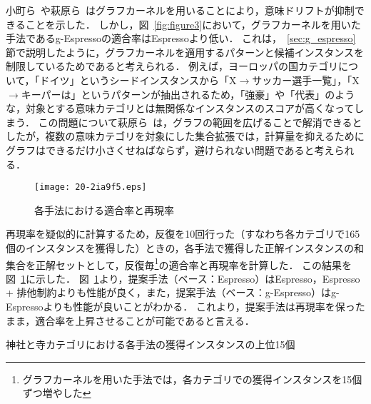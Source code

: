 \documentclass[japanese]{jnlp_1.4}
\begin{document}
小町ら~\cite{mamoru_komachi:2010}や萩原ら~\cite{masato_hagiwara:2011}はグラフカーネルを用いることにより，意味ドリフトが抑制できることを示した．
しかし，図~\ref{fig:figure3}において，グラフカーネルを用いた手法であるg-Espressoの適合率はEspressoより低い．
これは，~\ref{sec:g_espresso}節で説明したように，グラフカーネルを適用するパターンと候補インスタンスを制限しているためであると考えられる．
例えば，ヨーロッパの国カテゴリについて，「ドイツ」というシードインスタンスから「X$\to$サッカー選手一覧」，「X$\to$キーパーは」というパターンが抽出されるため，「強豪」や「代表」のような，対象とする意味カテゴリとは無関係なインスタンスのスコアが高くなってしまう．
この問題について萩原ら~\cite{masato_hagiwara:2011}は，グラフの範囲を広げることで解消できるとしたが，複数の意味カテゴリを対象にした集合拡張では，計算量を抑えるためにグラフはできるだけ小さくせねばならず，避けられない問題であると考えられる．

\begin{figure}[b]
\begin{center}
\texttt{[image: 20-2ia9f5.eps]}
\end{center}
 \caption{各手法における適合率と再現率}
 \label{fig:graph_pr_curve}
\end{figure}

再現率を疑似的に計算するため，反復を10回行った（すなわち各カテゴリで165個のインスタンスを獲得した）ときの，各手法で獲得した正解インスタンスの和集合を正解セットとして，反復毎\footnote{グラフカーネルを用いた手法では，各カテゴリでの獲得インスタンスを15個ずつ増やした}の適合率と再現率を計算した．
この結果を図~\ref{fig:graph_pr_curve}に示した．
図~\ref{fig:graph_pr_curve}より，提案手法（ベース：Espresso）はEspresso，Espresso + 排他制約よりも性能が良く，また，提案手法（ベース：g-Espresso）はg-Espressoよりも性能が良いことがわかる．
これより，提案手法は再現率を保ったまま，適合率を上昇させることが可能であると言える．

\begin{table}[b]
  \caption{神社と寺カテゴリにおける各手法の獲得インスタンスの上位15個}
 \label{tab:table1}

\end{table}
\end{document}
